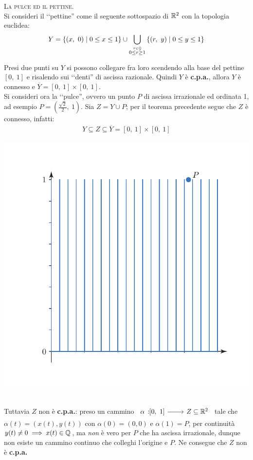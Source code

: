 \begin{example}\textsc{La pulce ed il pettine.}\\
	Si consideri il ‘‘pettine'' come il seguente sottospazio di $\mathbb{R} ^2$ con la topologia euclidea:
		\begin{equation*}
			Y= \left\{ (x,\ 0) \mid 0\leq x\leq 1 \right\} \cup \bigcup_{\stackrel{r\in\mathbb{Q}}{ 0\leq r\geq 1}} \left\{ (r,\ y) \mid 0\leq y \leq 1 \right\}
		\end{equation*}
\begin{minipage}{0.62\textwidth}
Presi due punti su $Y$ si possono collegare fra loro scendendo alla base del pettine $\left[0,\ 1\right]$ e risalendo sui ‘‘denti'' di ascissa razionale. Quindi $Y$ è \textbf{c.p.a.}, allora $Y$ è connesso e $\overline{Y}=\left[0,\ 1\right]\times \left[0,\ 1\right]$.\\
Si consideri ora la ‘‘pulce'', ovvero un punto $P$ di ascissa irrazionale ed ordinata 1, ad esempio $P=\left(\frac{\sqrt{2}}{2},\ 1\right)$. Sia $Z=Y\cup P$; per il teorema precedente segue che $Z$ è connesso, infatti:
\begin{gather*}
	Y\subseteq Z \subseteq \overline{Y}=\left[0,\ 1\right]\times \left[0,\ 1\right]	
\end{gather*}
	\end{minipage}
	\begin{minipage}{0.37\textwidth}
		\includegraphics[trim=1.1cm 0.5cm 0.5cm 1.25cm,clip,scale=0.50]{images/comb.pdf}
	\end{minipage}\\
Tuttavia $Z$ non è \textbf{c.p.a.}: preso un cammino $\funz \alpha {\left[0,\ 1\right]} {Z\subseteq \realset^2}$ tale che $\alpha(t)= \left( x(t), y(t)\right)$ con $\alpha (0)=(0,0)$ e $\alpha(1)=P$, per continuità $y(t)\neq 0 \implies x(t)\in\mathbb{Q}$, ma \textit{non} è vero per $P$ che ha ascissa irrazionale, dunque non esiste un cammino continuo che colleghi l'origine e $P$. Ne consegue che $Z$ non è \textbf{c.p.a.}
\end{example}
